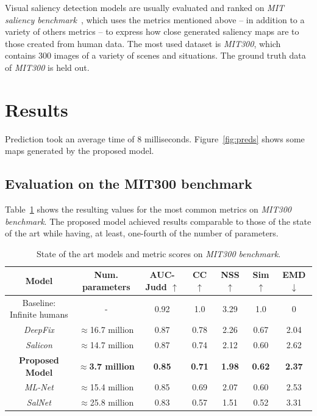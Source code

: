 \documentclass[journal]{IEEEtran}
\begin{document}
Visual saliency detection models are usually evaluated and ranked on
\emph{MIT saliency benchmark}~\cite{mit_sal_bm}, which uses the metrics
mentioned above -- in addition to a variety of others metrics --
to express how close generated saliency maps are to those created
from human data.
The most used dataset is \emph{MIT300},
which contains $300$ images of a variety of scenes and situations.
The ground truth data of \emph{MIT300} is held out.

\section{Results}
Prediction took an average time of 8 milliseconds.
Figure~\ref{fig:preds} shows some maps generated by the proposed model.

\subsection{Evaluation on the MIT300 benchmark}
Table~\ref{table:results} shows the resulting values for the most common
metrics on \emph{MIT300 benchmark}.
The proposed model achieved results comparable to those of the state of
the art while having, at least, one-fourth of the number of parameters.

\begin{table}
	\small
    \begin{center}
    \label{table:results}
    \caption{State of the art models and metric scores on
    \emph{MIT300 benchmark}.}
    \begin{tabular}{|c|c|c|c|c|c|c|}
        \hline
        Model & Num. parameters & AUC-Judd $\uparrow$ & CC $\uparrow$
            & NSS $\uparrow$ & Sim $\uparrow$ & EMD $\downarrow$\\
        \hline
        Baseline: Infinite humans & - & 0.92 & 1.0 & 3.29 & 1.0 & 0\\
        \hline
        \emph{DeepFix} & $\approx$16.7 million & 0.87 & 0.78
            & 2.26 & 0.67 & 2.04\\
        \hline
        \emph{Salicon} & $\approx$14.7 million & 0.87 & 0.74 & 2.12
            & 0.60 & 2.62\\
        \hline
        \textbf{Proposed Model} & $\approx$\textbf{3.7 million}
            & \textbf{0.85} &
        \textbf{0.71} & \textbf{1.98} & \textbf{0.62} & \textbf{2.37}\\
        \hline
        \emph{ML-Net} & $\approx$15.4 million & 0.85 & 0.69 & 2.07 & 0.60
            & 2.53\\
        \hline
        \emph{SalNet} & $\approx$25.8 million & 0.83 & 0.57 & 1.51
            & 0.52 & 3.31\\
        \hline
    \end{tabular}
    \end{center}
\end{table}
\end{document}
